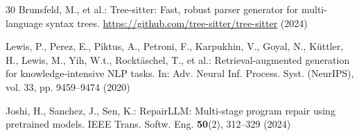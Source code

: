 \documentclass[runningheads]{llncs}
\begin{document}
\begin{thebibliography}{30}
Brunsfeld, M., et al.: Tree-sitter: Fast, robust parser generator for multi-language syntax trees. \url{https://github.com/tree-sitter/tree-sitter} (2024)

Lewis, P., Perez, E., Piktus, A., Petroni, F., Karpukhin, V., Goyal, N., K{\"u}ttler, H., Lewis, M., Yih, W.t., Rockt{\"a}schel, T., et al.: Retrieval-augmented generation for knowledge-intensive NLP tasks. In: Adv. Neural Inf. Process. Syst. (NeurIPS), vol. 33, pp. 9459--9474 (2020)

Joshi, H., Sanchez, J., Sen, K.: RepairLLM: Multi-stage program repair using pretrained models. IEEE Trans. Softw. Eng. \textbf{50}(2), 312--329 (2024)

\end{thebibliography}
\end{document}
